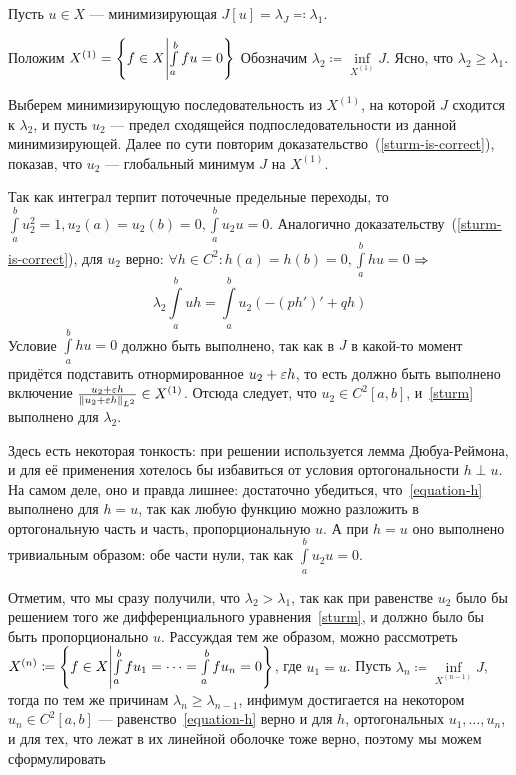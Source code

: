 \documentclass[a4paper]{article}
\begin{document}
    Пусть $u \in X$ --- минимизирующая $J[u] = \lambda_J \eqqcolon \lambda_1$.

    Положим $X^{(1)} = \left\{f \in X\middle|\int\limits_a^b{fu} = 0\right\}$
    Обозначим $\lambda_2 \coloneqq \inf\limits_{X^{(1)}}J$.
    Ясно, что $\lambda_2 \ge \lambda_1$.

    Выберем минимизирующую последовательность из $X^{(1)}$, на которой $J$ сходится к $\lambda_2$, и пусть $u_2$ --- предел сходящейся подпоследовательности из данной минимизирующей.
    Далее по сути повторим доказательство~(\cref{sturm-is-correct}), показав, что $u_2$ --- глобальный минимум $J$ на $X^{(1)}$.

    Так как интеграл терпит поточечные предельные переходы, то $\int\limits_{a}^{b}u_2^2 = 1, u_2(a) = u_2(b) = 0, {\int\limits_{a}^{b}u_2 u = 0}$.
    Аналогично доказательству~(\cref{sturm-is-correct}), для $u_2$ верно: $\forall h \in C^2: h(a) = h(b) = 0, \int\limits_{a}^{b}hu = 0$ $\Rightarrow$ \[\lambda_2 \int\limits_{a}^{b}uh = \int\limits_{a}^{b}u_2 (-(ph')' + qh)\label{equation-h}\tag{$**$}\]
    Условие $\int\limits_{a}^{b}hu = 0$ должно быть выполнено, так как в $J$ в какой-то момент придётся подставить отнормированное $u_2 + \varepsilon h$, то есть должно быть выполнено включение $\frac{u_2 + \varepsilon h}{\|u_2 + \varepsilon h\|_{L^2}} \in X^{(1)}$.
    Отсюда следует, что $u_2 \in C^2[a, b]$, и~\eqref{sturm} выполнено для $\lambda_2$.

    Здесь есть некоторая тонкость: при решении используется лемма Дюбуа-Реймона, и для её применения хотелось бы избавиться от условия ортогональности $h \perp u$.
    На самом деле, оно и правда лишнее: достаточно убедиться, что~\eqref{equation-h} выполнено для $h = u$, так как любую функцию можно разложить в ортогональную часть и часть, пропорциональную $u$.
    А при $h = u$ оно выполнено тривиальным образом: обе части нули, так как $\int\limits_{a}^{b}u_2 u = 0$.

    Отметим, что мы сразу получили, что $\lambda_2 > \lambda_1$, так как при равенстве $u_2$ было бы решением того же дифференциального уравнения~\eqref{sturm}, и должно было бы быть пропорционально $u$.
    Рассуждая тем же образом, можно рассмотреть $X^{(n)} \coloneqq \left\{f \in X\middle|\int\limits_{a}^{b}fu_1 = \dots = \int\limits_{a}^{b}fu_{n} = 0\right\}$, где $u_1 = u$.
    Пусть $\lambda_n \coloneqq \inf\limits_{X^{(n-1)}}J$, тогда по тем же причинам $\lambda_n \ge \lambda_{n-1}$, инфимум достигается на некотором $u_n \in C^2[a, b]$ --- равенство~\eqref{equation-h} верно и для $h$, ортогональных $u_1, \dots, u_n$, и для тех, что лежат в их линейной оболочке тоже верно, поэтому мы можем сформулировать
\end{document}
